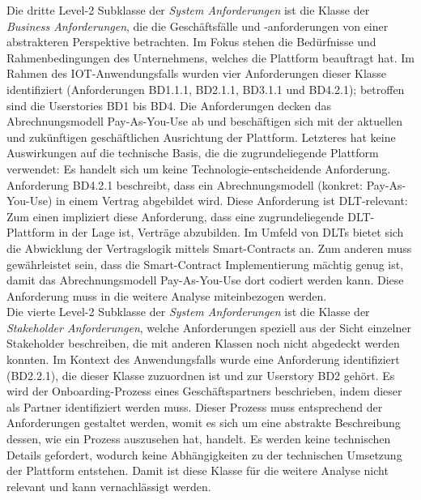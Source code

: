 Die dritte Level-2 Subklasse der \textit{System Anforderungen} ist die Klasse der \textit{Business Anforderungen}, die die Geschäftsfälle und -anforderungen von einer abstrakteren Perspektive betrachten. Im Fokus stehen die Bedürfnisse und Rahmenbedingungen des Unternehmens, welches die Plattform beauftragt hat. Im Rahmen des IOT-Anwendungsfalls wurden vier Anforderungen dieser Klasse identifiziert (Anforderungen BD1.1.1, BD2.1.1, BD3.1.1 und BD4.2.1); betroffen sind die Userstories BD1 bis BD4. Die Anforderungen decken das Abrechnungsmodell Pay-As-You-Use ab und beschäftigen sich mit der aktuellen und zukünftigen geschäftlichen Ausrichtung der Plattform. Letzteres hat keine Auswirkungen auf die technische Basis, die die zugrundeliegende Plattform verwendet: Es handelt sich um keine Technologie-entscheidende Anforderung. Anforderung BD4.2.1 beschreibt, dass ein Abrechnungsmodell (konkret: Pay-As-You-Use) in einem Vertrag abgebildet wird. Diese Anforderung ist \ac{DLT}-relevant: Zum einen impliziert diese Anforderung, dass eine zugrundeliegende \ac{DLT}-Plattform in der Lage ist, Verträge abzubilden. Im Umfeld von \ac{DLT}s bietet sich die Abwicklung der Vertragslogik mittels Smart-Contracts an. Zum anderen muss gewährleistet sein, dass die Smart-Contract Implementierung mächtig genug ist, damit das Abrechnungsmodell Pay-As-You-Use dort codiert werden kann. Diese Anforderung muss in die weitere Analyse miteinbezogen werden.\\

Die vierte Level-2 Subklasse der \textit{System Anforderungen} ist die Klasse der \textit{Stakeholder Anforderungen}, welche Anforderungen speziell aus der Sicht einzelner Stakeholder beschreiben, die mit anderen Klassen noch nicht abgedeckt werden konnten. Im Kontext des Anwendungsfalls wurde eine Anforderung identifiziert (BD2.2.1), die dieser Klasse zuzuordnen ist und zur Userstory BD2 gehört. Es wird der Onboarding-Prozess eines Geschäftspartners beschrieben, indem dieser als Partner identifiziert werden muss. Dieser Prozess muss entsprechend der Anforderungen gestaltet werden, womit es sich um eine abstrakte Beschreibung dessen, wie ein Prozess auszusehen hat, handelt. Es werden keine technischen Details gefordert, wodurch keine Abhängigkeiten zu der technischen Umsetzung der Plattform entstehen. Damit ist diese Klasse für die weitere Analyse nicht relevant und kann vernachlässigt werden.\\

